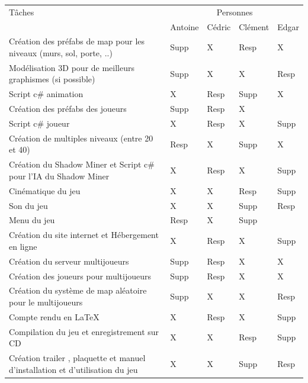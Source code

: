 \documentclass[titlepage, 13px, a4paper]{report}
\begin{document}
{\normalsize
	\begin{tabular}{|p{6cm}|p{1.2cm}|p{1.2cm}|p{1.2cm}|p{1.2cm}|}
		\hline
		Tâches & \multicolumn{4}{|c|}{Personnes} \\ 
		\cline{2-5}
			& Antoine & Cédric & Clément & Edgar \\
		\hline
		Création des préfabs de map pour les niveaux (murs, sol, porte, ..) & Supp\footnotemark[2] & X & Resp\footnotemark[1] & X \\
		\hline
		Modélisation 3D pour de meilleurs graphismes (si possible) & Supp\footnotemark[2] & X & X & Resp\footnotemark[1] \\
		\hline
		Script c\# animation & X & Resp\footnotemark[1] & Supp\footnotemark[2] & X \\
		\hline
		Création des préfabs des joueurs & Supp\footnotemark[2] & Resp\footnotemark[1] & X &  \\
		\hline
		Script c\# joueur & X & Resp\footnotemark[1] & X & Supp\footnotemark[2] \\
		\hline
		Création de multiples niveaux (entre 20 et 40) & Resp\footnotemark[1] & X & Supp\footnotemark[2] & X \\
		\hline
		Création du Shadow Miner et Script c\# pour l'IA du Shadow Miner & X & Resp\footnotemark[1] & X & Supp\footnotemark[2] \\
		\hline
		Cinématique du jeu & X & X & Resp\footnotemark[1] & Supp\footnotemark[2] \\
		\hline
		Son du jeu & X & X & Supp\footnotemark[2] & Resp\footnotemark[1] \\
		\hline
		Menu du jeu & Resp\footnotemark[1] & X & Supp\footnotemark[2] & \\
		\hline
		Création du site internet et Hébergement en ligne & X & Resp\footnotemark[1] & X & Supp\footnotemark[2] \\
		\hline
		Création du serveur multijoueurs & Supp\footnotemark[2] & Resp\footnotemark[1] & X & X \\
		\hline
		Création des joueurs pour multijoueurs & Supp\footnotemark[2] & Resp\footnotemark[1] & X & X \\
		\hline
		Création du système de map aléatoire pour le multijoueurs & Supp\footnotemark[2] & X & X & Resp\footnotemark[1] \\
		\hline
		Compte rendu en \LaTeX & X & Resp\footnotemark[1] & X & Supp\footnotemark[2]  \\
		\hline
		Compilation du jeu et enregistrement sur CD & X & X & Resp\footnotemark[1] & Supp\footnotemark[2] \\
		\hline
		Création trailer , plaquette et manuel d'installation et d'utilisation du jeu & X & X & Supp\footnotemark[2] & Resp\footnotemark[1] \\
		\hline
	\end{tabular}
	\label{repartition}		
}
\end{document}
